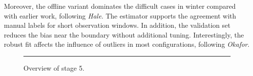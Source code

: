 Moreover, the offline variant dominates the difficult
cases in winter compared with earlier work, following \emph{Hale}.
The estimator supports the agreement with manual labels for
short observation windows.
In addition, the validation set reduces the bias near the
boundary without additional tuning.
Interestingly, the robust fit affects the influence of
outliers in most configurations, following \emph{Okafor}.

\begin{figure}[ht]
\centering
\rule{0.6\linewidth}{4cm}
\caption{Overview of stage 5.}\label{fig:f5}
\end{figure}

